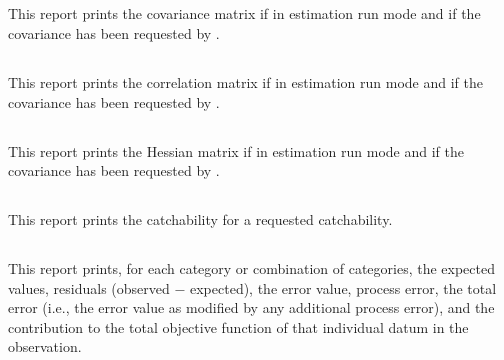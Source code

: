 \subsection{}\label{sec:Report-CovarianceMatrix}

This report prints the covariance matrix if in estimation run mode and if the covariance has been requested by .

\subsection{}\label{sec:Report-CorrelationMatrix}

This report prints the correlation matrix if in estimation run mode and if the covariance has been requested by .

\subsection{}\label{sec:Report-HessianMatrix}

This report prints the Hessian matrix if in estimation run mode and if the covariance has been requested by .

\subsection{}\label{sec:Report-Catchability}

This report prints the catchability for a requested catchability.

\subsection{}\label{sec:Report-Observation}

This report prints, for each category or combination of categories, the expected values, residuals (observed $-$ expected), the error value, process error, the total error (i.e., the error value as modified by any additional process error), and the contribution to the total objective function of that individual datum in the observation.

